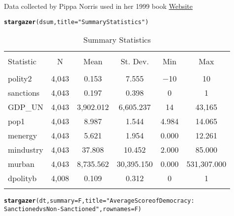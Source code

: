 \documentclass[a4paper]{article}\usepackage[]{graphicx}\usepackage[]{color}
\makeatletter
\newcommand{\hlstr}[1]{\textcolor[rgb]{0.192,0.494,0.8}{#1}}%
\newcommand{\hlstd}[1]{\textcolor[rgb]{0.345,0.345,0.345}{#1}}%
\newcommand{\hlkwc}[1]{\textcolor[rgb]{0.333,0.667,0.333}{#1}}%
\newcommand{\hlkwd}[1]{\textcolor[rgb]{0.737,0.353,0.396}{\textbf{#1}}}%
\newenvironment{kframe}{%
 \def\at@end@of@kframe{}%
 \ifinner\ifhmode%
  \def\at@end@of@kframe{\end{minipage}}%
  \begin{minipage}{\columnwidth}%
 \fi\fi%
 \def\FrameCommand##1{\hskip\@totalleftmargin \hskip-\fboxsep
 \colorbox{shadecolor}{##1}\hskip-\fboxsep
     \hskip-\linewidth \hskip-\@totalleftmargin \hskip\columnwidth}%
 \MakeFramed {\advance\hsize-\width
   \@totalleftmargin\z@ \linewidth\hsize
   \@setminipage}}%
 {\par\unskip\endMakeFramed%
 \at@end@of@kframe}
\makeatother
\begin{document}
\begin{landscape}
Data collected by Pippa Norris used in her 1999 book \href{https://sites.google.com/site/pippanorris3/research/data}{Website}
\clearpage
\begin{kframe}
\begin{alltt}
\hlkwd{stargazer}\hlstd{(dsum,} \hlkwc{title} \hlstd{=} \hlstr{"Summary Statistics"}\hlstd{)}
\end{alltt}
\end{kframe}
\begin{table}[!htbp] \centering 
  \caption{Summary Statistics} 
  \label{} 
\begin{tabular}{@{\extracolsep{5pt}}lccccc} 
\\[-1.8ex]\hline 
\hline \\[-1.8ex] 
Statistic & \multicolumn{1}{c}{N} & \multicolumn{1}{c}{Mean} & \multicolumn{1}{c}{St. Dev.} & \multicolumn{1}{c}{Min} & \multicolumn{1}{c}{Max} \\ 
\hline \\[-1.8ex] 
polity2 & 4,043 & 0.153 & 7.555 & $-$10 & 10 \\ 
sanctions & 4,043 & 0.197 & 0.398 & 0 & 1 \\ 
GDP\_UN & 4,043 & 3,902.012 & 6,605.237 & 14 & 43,165 \\ 
pop1 & 4,043 & 8.987 & 1.544 & 4.984 & 14.065 \\ 
menergy & 4,043 & 5.621 & 1.954 & 0.000 & 12.261 \\ 
mindustry & 4,043 & 37.808 & 10.452 & 2.000 & 85.000 \\ 
murban & 4,043 & 8,735.562 & 30,395.150 & 0.000 & 531,307.000 \\ 
dpolityb & 4,008 & 0.109 & 0.312 & 0 & 1 \\ 
\hline \\[-1.8ex] 
\end{tabular} 
\end{table} 
\begin{kframe}\begin{alltt}
\hlkwd{stargazer}\hlstd{(dt,} \hlkwc{summary} \hlstd{= F,} \hlkwc{title} \hlstd{=} \hlstr{"Average Score of Democracy: 
          Sanctioned vs Non-Sanctioned"}\hlstd{,} \hlkwc{rownames} \hlstd{= F)}
\end{alltt}
\end{kframe}

\end{landscape}
\end{document}
